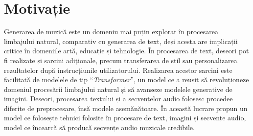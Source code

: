 \chapter*{Motivație} 

Generarea de muzică este un domeniu mai puțin explorat în procesarea limbajului natural, comparativ cu generarea de text, deși acesta are implicații critice în domeniile artă, educație și tehnologie. În procesarea de text, deseori pot fi realizate și sarcini adiționale, precum transferarea de stil sau personalizarea rezultatelor după instrucțiunile utilizatorului. Realizarea acestor sarcini este facilitată de modelele de tip ``\textit{Transformer}'', un model ce a reușit să revoluționeze domeniul procesării limbajului natural și să avanseze modelele generative de imagini. Deseori, procesarea textului și a secvențelor audio folosesc procedee diferite de preprocesare, însă modele asemănătoare. În această lucrare propun un model ce folosește tehnici folosite în procesare de text, imagini și secvențe audio, model ce încearcă să producă secvențe audio muzicale credibile. 